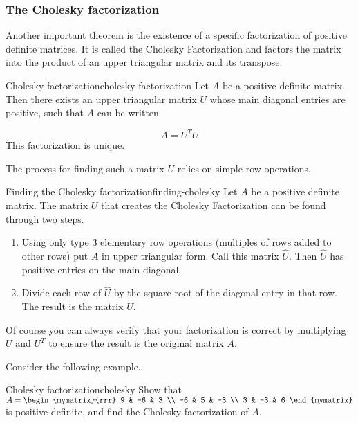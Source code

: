 \subsubsection{The Cholesky factorization}

Another important theorem is the existence of a specific factorization of positive definite matrices. It is called the Cholesky Factorization and factors the matrix into the product of an upper triangular matrix and its transpose.

\begin{theorem}{Cholesky factorization}{cholesky-factorization}
Let $A$ be a positive definite matrix. Then
there exists an upper triangular matrix $U$ whose main diagonal entries are positive, such that $A$ can be written

\begin{equation*}
A=
U^TU
\end{equation*}
This factorization is unique.
\end{theorem}

The process for finding such a matrix $U$ relies on simple row operations.

\begin{procedure}{Finding the Cholesky factorization}{finding-cholesky}
Let $A$ be a positive definite matrix. The matrix $U$ that creates the Cholesky Factorization can be found through two steps.
\begin{enumerate}
\item Using only type $3$ elementary row operations (multiples of rows added to other rows) put $A$ in upper triangular form. Call this matrix $\hat{U}$. Then $\hat{U}$ has positive entries on the main diagonal.
\item Divide each row of $\hat{U}$ by the square root of the diagonal entry in that row. The result is the matrix $U$.
\end{enumerate}
\end{procedure}

Of course you can always verify that your factorization is correct by multiplying $U$ and $U^T$ to ensure the result is the original matrix $A$.

Consider the following example.

\begin{example}{Cholesky factorization}{cholesky}
Show that
$A=\begin{mymatrix}{rrr}
9 & -6 & 3 \\ -6 & 5 & -3 \\ 3 & -3 & 6
\end{mymatrix}$
is positive definite, and find the Cholesky factorization of $A$.
\end{example}

